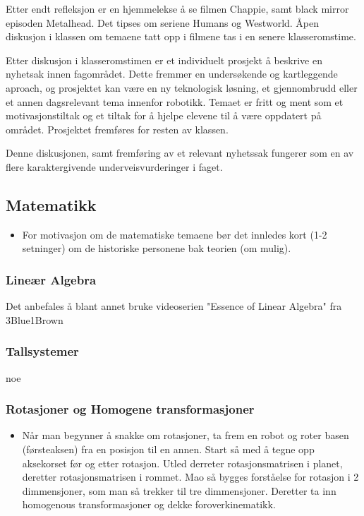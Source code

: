 \begin{itemize}
\begin{itemize}
            \end{itemize}
        Etter endt refleksjon er en hjemmelekse å se filmen Chappie, samt black mirror episoden Metalhead. Det tipses om seriene Humans og Westworld. Åpen diskusjon i klassen om temaene tatt opp i filmene tas i en senere klasseromstime.

        Etter diskusjon i klasseromstimen er et individuelt prosjekt å beskrive en nyhetsak innen fagområdet. Dette fremmer en undersøkende og kartleggende aproach, og prosjektet kan være en ny teknologisk løsning, et gjennombrudd eller et annen dagsrelevant tema innenfor robotikk. Temaet er fritt og ment som et motivasjonstiltak og et tiltak for å hjelpe elevene til å være oppdatert på området. Prosjektet fremføres for resten av klassen.

        Denne diskusjonen, samt fremføring av et relevant nyhetssak fungerer som en av flere karaktergivende underveisvurderinger i faget.
    \end{itemize}



\subsection{Matematikk}


    \begin{itemize}
        \item For motivasjon om de matematiske temaene bør det innledes kort (1-2 setninger) om de historiske personene bak teorien (om mulig).
    \end{itemize}


    \subsubsection{Lineær Algebra}
        Det anbefales å blant annet bruke videoserien "Essence of Linear Algebra" fra 3Blue1Brown


    \subsubsection{Tallsystemer}
        noe


    \subsubsection{Rotasjoner og Homogene transformasjoner}
        \begin{itemize}
            \item Når man begynner å snakke om rotasjoner, ta frem en robot og roter basen (førsteaksen) fra en posisjon til en annen. Start så med å tegne opp aksekorset før og etter rotasjon. Utled derreter rotasjonsmatrisen i planet, deretter rotasjonsmatrisen i rommet. Mao så bygges forståelse for rotasjon i 2 dimmensjoner, som man så trekker til tre dimmensjoner. Deretter ta inn homogenous transformasjoner og dekke foroverkinematikk.
        \end{itemize}


